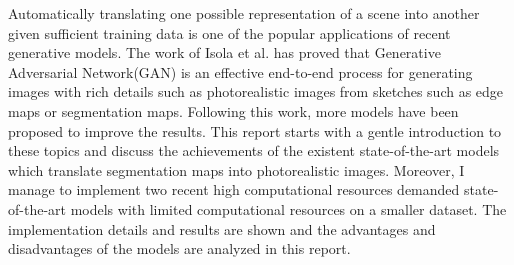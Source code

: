 Automatically translating one possible representation of a scene into another given sufficient training data 
is one of the popular applications of recent generative models. The work of Isola et al.\cite{pix2pix2016} 
has proved that Generative Adversarial Network(GAN) is an effective end-to-end process for generating images 
with rich details such as photorealistic images from sketches such as edge maps or segmentation maps. 
Following this work, more models have been proposed to improve the results. This report starts with a gentle 
introduction to these topics and discuss the achievements of the existent state-of-the-art models which 
translate segmentation maps into photorealistic images. 
Moreover, I manage to implement two recent high computational resources demanded state-of-the-art models with 
limited computational resources on a smaller dataset. The implementation details and 
results are shown and the advantages and disadvantages of the models are analyzed in this report.



